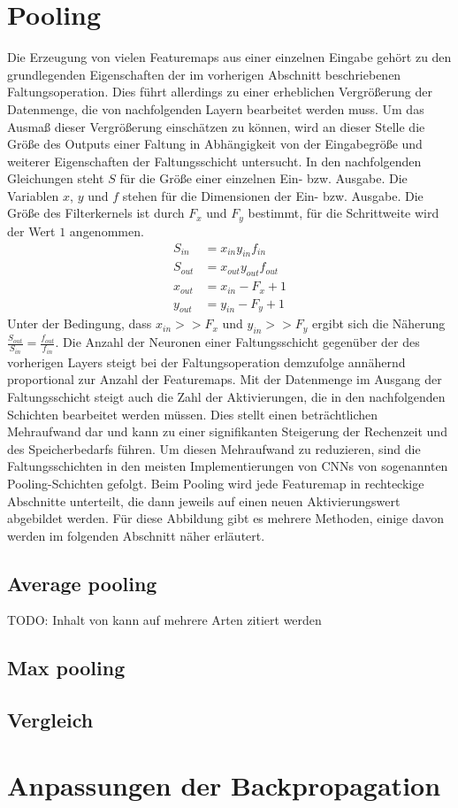 \documentclass[../main.tex]{subfiles}
\begin{document}
\section{Pooling}
Die Erzeugung von vielen Featuremaps aus einer einzelnen Eingabe gehört zu den grundlegenden Eigenschaften der im vorherigen Abschnitt beschriebenen Faltungsoperation. Dies führt allerdings zu einer erheblichen Vergrößerung der Datenmenge, die von nachfolgenden Layern bearbeitet werden muss. Um das Ausmaß dieser Vergrößerung einschätzen zu können, wird an dieser Stelle die Größe des Outputs einer Faltung in Abhängigkeit von der Eingabegröße und weiterer Eigenschaften der Faltungsschicht untersucht. 
In den nachfolgenden Gleichungen steht \(S\) für die Größe einer einzelnen Ein- bzw. Ausgabe. Die Variablen \(x\), \(y\) und \(f\) stehen für die Dimensionen der Ein- bzw. Ausgabe. Die Größe des Filterkernels ist durch \(F_x\) und \(F_y\) bestimmt, für die Schrittweite wird der Wert \(1\) angenommen. 
\begin{equation}
\begin{split}
S_{in} &= x_{in} y_{in} f_{in}\\
S_{out} &= x_{out} y_{out} f_{out}\\
x_{out} &= x_{in} - F_x + 1\\
y_{out} &= y_{in} - F_y + 1
\end{split}
\end{equation}
Unter der Bedingung, dass \(x_{in} >> F_x\) und \(y_{in} >> F_y\) ergibt sich die Näherung \(\frac{S_{out}}{S_{in}} = \frac{f_{out}}{f_{in}}\). Die Anzahl der Neuronen einer Faltungsschicht gegenüber der des vorherigen Layers steigt bei der Faltungsoperation demzufolge annähernd proportional zur Anzahl der Featuremaps. 
Mit der Datenmenge im Ausgang der Faltungsschicht steigt auch die Zahl der Aktivierungen, die in den nachfolgenden Schichten bearbeitet werden müssen. Dies stellt einen beträchtlichen Mehraufwand dar und kann zu einer signifikanten Steigerung der Rechenzeit und des Speicherbedarfs führen. Um diesen Mehraufwand zu reduzieren, sind die Faltungsschichten in den meisten Implementierungen von CNNs von sogenannten Pooling-Schichten gefolgt. Beim Pooling wird jede Featuremap in rechteckige Abschnitte unterteilt, die dann jeweils auf einen neuen Aktivierungswert abgebildet werden. Für diese Abbildung gibt es mehrere Methoden, einige davon werden im folgenden Abschnitt näher erläutert. 
\subsection{Average pooling}
TODO: Inhalt von \cite{paperMixedPooling} kann auf mehrere Arten zitiert werden \parencite[368]{paperMixedPooling}
\subsection{Max pooling}

\subsection{Vergleich}

\section{Anpassungen der Backpropagation}
\end{document}
